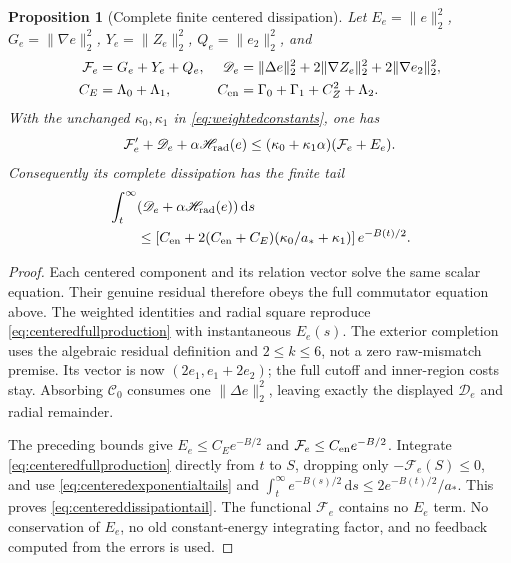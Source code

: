 \documentclass[11pt]{article}
\numberwithin{equation}{section}
\newtheorem{proposition}[theorem]{Proposition}
\newcommand{\dd}{\,\mathrm d}
\begin{document}
\begin{proposition}[Complete finite centered dissipation]
\label{prop:centereddissipation}
Let $E_e=\|e\|_2^2$, $G_e=\|\nabla e\|_2^2$,
$Y_e=\|Z_e\|_2^2$, $Q_e=\|e_2\|_2^2$, and
\begin{align*}
 \mathcal F_e&=G_e+Y_e+Q_e,&
 \mathscr D_e&=\|\Delta e\|_2^2
             +2\|\nabla Z_e\|_2^2+2\|\nabla e_2\|_2^2,\\
 C_E&=\Lambda_0+\Lambda_1,&
 C_{\rm en}&=\Gamma_0+\Gamma_1+C_Z^2+\Lambda_2.
\end{align*}
With the unchanged $\kappa_0,\kappa_1$ in
\eqref{eq:weightedconstants}, one has
\begin{equation}\label{eq:centeredfullproduction}
 \mathcal F_e'+\mathscr D_e+\alpha\mathscr H_{\rm rad}(e)
 \le(\kappa_0+\kappa_1\alpha)(\mathcal F_e+E_e).
\end{equation}
Consequently its complete dissipation has the finite tail
\begin{equation}\label{eq:centereddissipationtail}
 \begin{split}
 &\int_t^\infty(\mathscr D_e+\alpha\mathscr H_{\rm rad}(e))\dd s\\
 &\qquad\le\left[C_{\rm en}
       +2(C_{\rm en}+C_E)(\kappa_0/a_*+\kappa_1)\right]e^{-B(t)/2}.
 \end{split}
\end{equation}
\end{proposition}
\begin{proof}
Each centered component and its relation vector solve the same scalar
equation. Their genuine residual therefore obeys the full commutator
equation above. The weighted identities and radial square reproduce
\eqref{eq:centeredfullproduction} with instantaneous $E_e(s)$.
The exterior completion uses the algebraic residual definition and
$2\le k\le6$, not a zero raw-mismatch premise. Its vector is now
$(2e_1,e_1+2e_2)$; the full cutoff and inner-region costs stay.
Absorbing $\mathscr C_0$ consumes one $\|\Delta e\|_2^2$, leaving
exactly the displayed $\mathscr D_e$ and radial remainder.

The preceding bounds give $E_e\le C_Ee^{-B/2}$ and
$\mathcal F_e\le C_{\rm en}e^{-B/2}$. Integrate
\eqref{eq:centeredfullproduction} directly from $t$ to $S$, dropping
only $-\mathcal F_e(S)\le0$, and use
\eqref{eq:centeredexponentialtails} and
$\int_t^\infty e^{-B(s)/2}\dd s\le2e^{-B(t)/2}/a_*$.
This proves \eqref{eq:centereddissipationtail}.
The functional $\mathcal F_e$ contains no $E_e$ term. No conservation
of $E_e$, no old constant-energy integrating factor, and no feedback
computed from the errors is used.
\end{proof}
\end{document}

